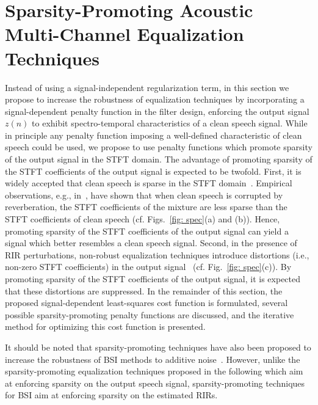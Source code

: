 \documentclass[10pt]{IEEEtran}
\begin{document}
\section{Sparsity-Promoting Acoustic Multi-Channel Equalization Techniques}
\label{sec: spa}
Instead of using a signal-independent regularization term, in this section we propose to increase the robustness of equalization techniques by incorporating a signal-dependent penalty function in the filter design, enforcing the output signal $z(n)$ to exhibit spectro-temporal characteristics of a clean speech signal.
While in principle any penalty function imposing a well-defined characteristic of clean speech could be used, we propose to use penalty functions which promote sparsity of the output signal in the STFT domain.
The advantage of promoting sparsity of the STFT coefficients of the output signal is expected to be twofold.
First, it is widely accepted that clean speech is sparse in the STFT domain~\cite{makino_2010,Tashev_IWAENC_2010,Gerkmann_IWAENC_2010}. 
Empirical observations, e.g., in~\cite{makino_2010}, have shown that when clean speech is corrupted by reverberation, the STFT coefficients of the mixture are less sparse than the STFT coefficients of clean speech (cf. Figs.~\ref{fig: spec}(a) and (b)).
Hence, promoting sparsity of the STFT coefficients of the output signal can yield a signal which better resembles a clean speech signal.
Second, in the presence of RIR perturbations, non-robust equalization techniques introduce distortions (i.e., non-zero STFT coefficients) in the output signal~\cite{Kodrasi_ITASLP_2013} (cf. Fig.~\ref{fig: spec}(c)).
By promoting sparsity of the STFT coefficients of the output signal, it is expected that these distortions are suppressed.
In the remainder of this section, the proposed signal-dependent least-squares cost function is formulated, several possible sparsity-promoting penalty functions are discussed, and the iterative method for optimizing this cost function is presented. 

It should be noted that sparsity-promoting techniques have also been proposed to increase the robustness of BSI methods to additive noise~\cite{Lin_Neural_2008,Kowalczyk_SPL_2013}.
    However, unlike the sparsity-promoting equalization techniques proposed in the following which aim at enforcing sparsity on the output speech signal, sparsity-promoting techniques for BSI aim at enforcing sparsity on the estimated RIRs.
\end{document}
